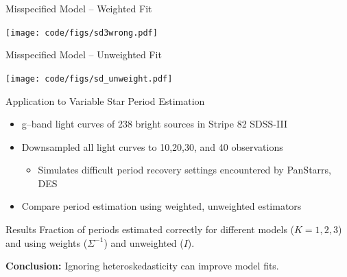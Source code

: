 \documentclass[12pt]{beamer}
\begin{document}


\begin{frame}{Misspecified Model -- Weighted Fit}
\begin{center}
\texttt{[image: code/figs/sd3wrong.pdf]}
\end{center}
\end{frame}

\begin{frame}{Misspecified Model -- Unweighted Fit}
\begin{center}
\texttt{[image: code/figs/sd\_unweight.pdf]}
\end{center}
\end{frame}








\begin{frame}{Application to Variable Star Period Estimation}
\begin{itemize}
\item g--band light curves of 238 bright sources in Stripe 82 SDSS-III
\item Downsampled all light curves to 10,20,30, and 40 observations
\begin{itemize}
\item Simulates difficult period recovery settings encountered by PanStarrs, DES
\end{itemize}
\item Compare period estimation using weighted, unweighted estimators
\end{itemize}
\end{frame}


\begin{frame}{Results}
Fraction of periods estimated correctly for different models ($K=1,2,3$) and using weights ($\Sigma^{-1}$) and unweighted ($I$).



\vspace{.1in}
\textbf{Conclusion:} Ignoring heteroskedasticity can improve model fits.
\end{frame}
\end{document}

